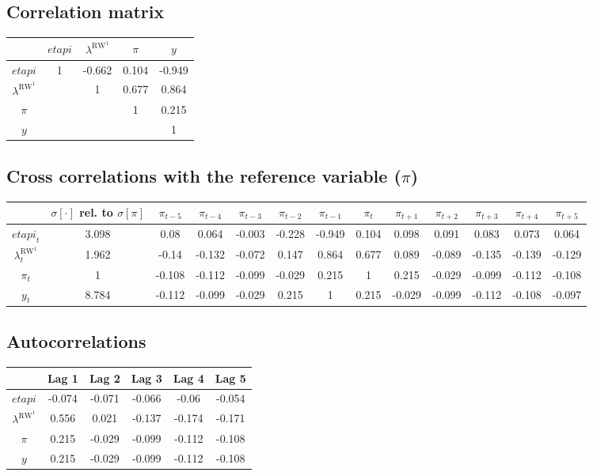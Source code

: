 \subsection{Correlation matrix}

\begin{tabular}{c|cccc|}
  & ${e\!t\!a\!p\!i}$ & $\lambda^{\mathrm{RW}^{\mathrm{1}}}$ & $\pi$ & $y$\\
\hline
${e\!t\!a\!p\!i}$ & 1 & -0.662 & 0.104 & -0.949 \\
$\lambda^{\mathrm{RW}^{\mathrm{1}}}$ &  & 1 & 0.677 & 0.864 \\
$\pi$ &  &  & 1 & 0.215 \\
$y$ &  &  &  & 1 \\
\hline
\end{tabular}


\subsection{Cross correlations with the reference variable ($\pi$)}

\begin{tabular}{c|c|c|c|c|c|c|c|c|c|c|c|c|}
  & $\sigma[\cdot]$ rel. to $\sigma[\pi]$ & $\pi_{t-5}$ & $\pi_{t-4}$ & $\pi_{t-3}$ & $\pi_{t-2}$ & $\pi_{t-1}$ & $\pi_{t}$ & $\pi_{t+1}$ & $\pi_{t+2}$ & $\pi_{t+3}$ & $\pi_{t+4}$ & $\pi_{t+5}$\\
\hline
${e\!t\!a\!p\!i}_{t}$ & 3.098 & 0.08 & 0.064 & -0.003 & -0.228 & -0.949 & 0.104 & 0.098 & 0.091 & 0.083 & 0.073 & 0.064 \\
$\lambda^{\mathrm{RW}^{\mathrm{1}}}_{t}$ & 1.962 & -0.14 & -0.132 & -0.072 & 0.147 & 0.864 & 0.677 & 0.089 & -0.089 & -0.135 & -0.139 & -0.129 \\
$\pi_{t}$ & 1 & -0.108 & -0.112 & -0.099 & -0.029 & 0.215 & 1 & 0.215 & -0.029 & -0.099 & -0.112 & -0.108 \\
$y_{t}$ & 8.784 & -0.112 & -0.099 & -0.029 & 0.215 & 1 & 0.215 & -0.029 & -0.099 & -0.112 & -0.108 & -0.097 \\
\hline
\end{tabular}


\subsection{Autocorrelations}

\begin{tabular}{c|ccccc|}
  & Lag 1 & Lag 2 & Lag 3 & Lag 4 & Lag 5\\
\hline
${e\!t\!a\!p\!i}$ & -0.074 & -0.071 & -0.066 & -0.06 & -0.054 \\
$\lambda^{\mathrm{RW}^{\mathrm{1}}}$ & 0.556 & 0.021 & -0.137 & -0.174 & -0.171 \\
$\pi$ & 0.215 & -0.029 & -0.099 & -0.112 & -0.108 \\
$y$ & 0.215 & -0.029 & -0.099 & -0.112 & -0.108 \\
\hline
\end{tabular}




